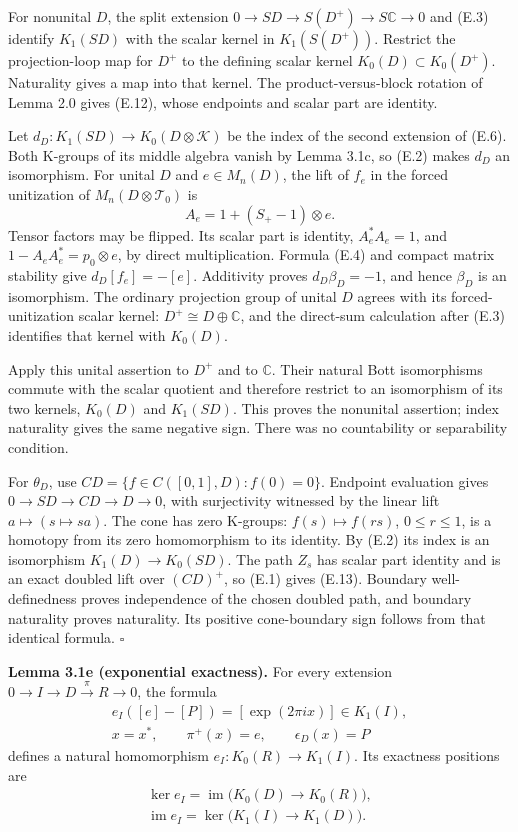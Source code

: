 \documentclass[
  11pt,
]{article}
\begin{document}
For nonunital \(D\), the split extension
\(0\to SD\to S(D^+)\to S\mathbb C\to0\) and (E.3) identify \(K_1(SD)\)
with the scalar kernel in \(K_1(S(D^+))\). Restrict the projection-loop
map for \(D^+\) to the defining scalar kernel
\(K_0(D)\subset K_0(D^+)\). Naturality gives a map into that kernel. The
product-versus-block rotation of Lemma 2.0 gives (E.12), whose endpoints
and scalar part are identity.

Let \(d_D:K_1(SD)\to K_0(D\otimes\mathcal K)\) be the index of the
second extension of (E.6). Both K-groups of its middle algebra vanish by
Lemma 3.1c, so (E.2) makes \(d_D\) an isomorphism. For unital \(D\) and
\(e\in M_n(D)\), the lift of \(f_e\) in the forced unitization of
\(M_n(D\otimes\mathcal T_0)\) is \[
A_e=1+(S_+-1)\otimes e.
\] Tensor factors may be flipped. Its scalar part is identity,
\(A_e^*A_e=1\), and \(1-A_eA_e^*=p_0\otimes e\), by direct
multiplication. Formula (E.4) and compact matrix stability give
\(d_D[f_e]=-[e]\). Additivity proves \(d_D\beta_D=-1\), and hence
\(\beta_D\) is an isomorphism. The ordinary projection group of unital
\(D\) agrees with its forced-unitization scalar kernel:
\(D^+\cong D\oplus\mathbb C\), and the direct-sum calculation after
(E.3) identifies that kernel with \(K_0(D)\).

Apply this unital assertion to \(D^+\) and to \(\mathbb C\). Their
natural Bott isomorphisms commute with the scalar quotient and therefore
restrict to an isomorphism of its two kernels, \(K_0(D)\) and
\(K_1(SD)\). This proves the nonunital assertion; index naturality gives
the same negative sign. There was no countability or separability
condition.

For \(\theta_D\), use \(CD=\{f\in C([0,1],D):f(0)=0\}\). Endpoint
evaluation gives \(0\to SD\to CD\to D\to0\), with surjectivity witnessed
by the linear lift \(a\mapsto(s\mapsto sa)\). The cone has zero
K-groups: \(f(s)\mapsto f(rs)\), \(0\leq r\leq1\), is a homotopy from
its zero homomorphism to its identity. By (E.2) its index is an
isomorphism \(K_1(D)\to K_0(SD)\). The path \(Z_s\) has scalar part
identity and is an exact doubled lift over \((CD)^+\), so (E.1) gives
(E.13). Boundary well-definedness proves independence of the chosen
doubled path, and boundary naturality proves naturality. Its positive
cone-boundary sign follows from that identical formula. \(\square\)

\textbf{Lemma 3.1e (exponential exactness).} For every extension
\(0\to I\to D\xrightarrow{\pi}R\to0\), the formula \[
\begin{gathered}
e_I([e]-[P])=[\exp(2\pi i x)]\in K_1(I),\\
x=x^*,\qquad \pi^+(x)=e,\qquad \epsilon_D(x)=P
\end{gathered}
\tag{E.14}
\] defines a natural homomorphism \(e_I:K_0(R)\to K_1(I)\). Its
exactness positions are \[
\begin{gathered}
\ker e_I=\operatorname{im}\bigl(K_0(D)\to K_0(R)\bigr),\\
\operatorname{im}e_I=\ker\bigl(K_1(I)\to K_1(D)\bigr).
\end{gathered}
\tag{E.15}
\]
\end{document}
